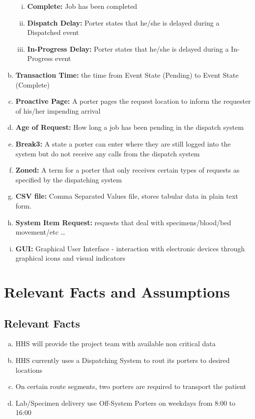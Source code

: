 \documentclass[paper=letter, fontsize=10pt]{scrartcl}
\numberwithin{equation}{section}		%
\numberwithin{figure}{section}			%
\numberwithin{table}{section}				%
\begin{document}
\begin{enumerate}[(a)]
\begin{enumerate}[(i)]
		\item \textbf{Complete:} Job has been completed
		\item \textbf{Dispatch Delay:} Porter states that he/she is delayed during a Dispatched event
		\item \textbf{In-Progress Delay:} Porter states that he/she is delayed during a In-Progress event
	\end{enumerate} 
	\item \textbf{Transaction Time:} the time from Event State (Pending) to Event State (Complete)
	\item \textbf{Proactive Page:} A porter pages the request location to inform the requester of his/her impending arrival      
	\item \textbf{Age of Request:} How long a job has been pending in the dispatch system
	\item \textbf{Break3:} A state a porter can enter where they are still logged into the system but do not receive any calls from the dispatch system
	\item \textbf{Zoned:} A term for a porter that only receives certain types of requests as specified by the dispatching system 
	\item \textbf{CSV file:} Comma Separated Values file, stores tabular data in plain text form. 
	\item \textbf{System Item Request:} requests that deal with specimens/blood/bed movement/etc \ldots
	\item \textbf{GUI:} Graphical User Interface - interaction with electronic devices through graphical icons and visual indicators
\end{enumerate}

\section{Relevant Facts and Assumptions}
\subsection{Relevant Facts}
\begin{enumerate}[(a)]
	\item HHS will provide the project team with available non critical data
	\item HHS currently uses a Dispatching System to rout its porters to desired locations
	\item On certain route segments, two porters are required to transport the patient 
	\item Lab/Specimen delivery use Off-System Porters on weekdays from 8:00 to 16:00
\end{enumerate}
\end{document}
